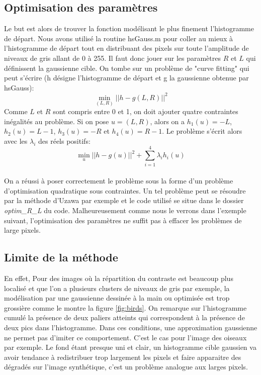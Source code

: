 \documentclass{article}
\begin{document}
\subsection*{Optimisation des paramètres}
Le but est alors de trouver la fonction modélisant le plus finement l'histogramme de départ. Nous avons utilisé la routine hsGauss.m pour coller au mieux à l'histogramme de départ tout en distribuant des pixels sur toute l'amplitude de niveaux de gris allant de 0 à 255. Il faut donc jouer sur les paramètres $R$ et $L$ qui définissent la gaussienne cible. On tombe sur un problème de "curve fitting" qui peut s'écrire (h désigne l'histogramme de départ et g la gaussienne obtenue par hsGauss):
\begin{equation}
\min_{(L, R)} ||h - g(L, R)||^2
\end{equation} 
Comme $L$ et $R$ sont compris entre 0 et 1, on doit ajouter quatre contraintes inégalités au problème. Si on pose $u=(L,R)$, alors on a $h_1(u) = -L$, $h_2(u) = L-1$, $h_3(u) = -R$ et $h_4(u) = R-1$. Le problème s'écrit alors avec les $\lambda_i$ des réels positifs:
\begin{equation}
\min_{u} ||h - g(u)||^2 + \sum_{i=1}^4 \lambda_i h_i(u)
\end{equation} 
\paragraph*{}
On a réussi à poser correctement le problème sous la forme d'un problème d'optimisation quadratique sous contraintes. Un tel problème peut se résoudre par la méthode d'Uzawa par exemple et le code utilisé se situe dans le dossier \textit{optim\_R\_L} du code. Malheureusement comme nous le verrons dans l'exemple suivant, l'optimisation des paramètres ne suffit pas à effacer les problèmes de large pixels.
\pagebreak
\subsection*{Limite de la méthode}
En effet, Pour des images où la répartition du contraste est beaucoup plus localisé et que l'on a plusieurs clusters de niveaux de gris par exemple, la modélisation par une gaussienne dessinée à la main ou optimisée est trop grossière comme le montre la figure \ref{fig:birds}. On remarque sur l'histogramme cumulé la présence de deux paliers atteints qui correspondent à la présence de deux pics dans l'histogramme. Dans ces conditions, une approximation gaussienne ne permet pas d'imiter ce comportement. C'est le cas pour l'image des oiseaux par exemple. Le fond étant presque uni et clair, un histogramme cible gaussien va avoir tendance à redistribuer trop largement les pixels et faire apparaitre des dégradés sur l'image synthétique, c'est un problème analogue aux larges pixels.
\end{document}
